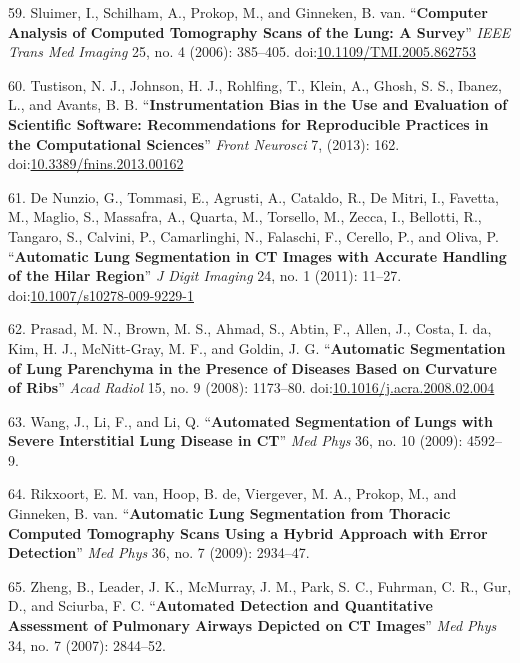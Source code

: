 \documentclass[11pt,]{article}
\begin{document}
\hypertarget{ref-Sluimer:2006aa}{}
59. Sluimer, I., Schilham, A., Prokop, M., and Ginneken, B. van.
``\textbf{Computer Analysis of Computed Tomography Scans of the Lung: A
Survey}'' \emph{IEEE Trans Med Imaging} 25, no. 4 (2006): 385--405.
doi:\href{https://doi.org/10.1109/TMI.2005.862753}{10.1109/TMI.2005.862753}

\hypertarget{ref-Tustison:2013aa}{}
60. Tustison, N. J., Johnson, H. J., Rohlfing, T., Klein, A., Ghosh, S.
S., Ibanez, L., and Avants, B. B. ``\textbf{Instrumentation Bias in the
Use and Evaluation of Scientific Software: Recommendations for
Reproducible Practices in the Computational Sciences}'' \emph{Front
Neurosci} 7, (2013): 162.
doi:\href{https://doi.org/10.3389/fnins.2013.00162}{10.3389/fnins.2013.00162}

\hypertarget{ref-De-Nunzio:2011aa}{}
61. De Nunzio, G., Tommasi, E., Agrusti, A., Cataldo, R., De Mitri, I.,
Favetta, M., Maglio, S., Massafra, A., Quarta, M., Torsello, M., Zecca,
I., Bellotti, R., Tangaro, S., Calvini, P., Camarlinghi, N., Falaschi,
F., Cerello, P., and Oliva, P. ``\textbf{Automatic Lung Segmentation in
CT Images with Accurate Handling of the Hilar Region}'' \emph{J Digit
Imaging} 24, no. 1 (2011): 11--27.
doi:\href{https://doi.org/10.1007/s10278-009-9229-1}{10.1007/s10278-009-9229-1}

\hypertarget{ref-Prasad:2008aa}{}
62. Prasad, M. N., Brown, M. S., Ahmad, S., Abtin, F., Allen, J., Costa,
I. da, Kim, H. J., McNitt-Gray, M. F., and Goldin, J. G.
``\textbf{Automatic Segmentation of Lung Parenchyma in the Presence of
Diseases Based on Curvature of Ribs}'' \emph{Acad Radiol} 15, no. 9
(2008): 1173--80.
doi:\href{https://doi.org/10.1016/j.acra.2008.02.004}{10.1016/j.acra.2008.02.004}

\hypertarget{ref-Wang:2009aa}{}
63. Wang, J., Li, F., and Li, Q. ``\textbf{Automated Segmentation of
Lungs with Severe Interstitial Lung Disease in CT}'' \emph{Med Phys} 36,
no. 10 (2009): 4592--9.

\hypertarget{ref-Rikxoort:2009aa}{}
64. Rikxoort, E. M. van, Hoop, B. de, Viergever, M. A., Prokop, M., and
Ginneken, B. van. ``\textbf{Automatic Lung Segmentation from Thoracic
Computed Tomography Scans Using a Hybrid Approach with Error
Detection}'' \emph{Med Phys} 36, no. 7 (2009): 2934--47.

\hypertarget{ref-Zheng:2007aa}{}
65. Zheng, B., Leader, J. K., McMurray, J. M., Park, S. C., Fuhrman, C.
R., Gur, D., and Sciurba, F. C. ``\textbf{Automated Detection and
Quantitative Assessment of Pulmonary Airways Depicted on CT Images}''
\emph{Med Phys} 34, no. 7 (2007): 2844--52.
\end{document}
